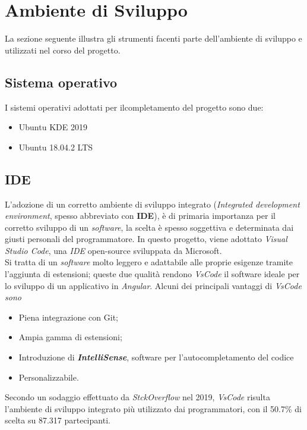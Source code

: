 \section{Ambiente di Sviluppo}
La sezione seguente illustra gli strumenti facenti parte dell'ambiente di sviluppo e utilizzati nel corso del progetto.

\subsection{Sistema operativo}
I sistemi operativi adottati per ilcompletamento del progetto sono due:
\begin{itemize}
	\item Ubuntu KDE 2019
	\item Ubuntu 18.04.2 LTS
\end{itemize}

\subsection{IDE}
L'adozione di un corretto ambiente di sviluppo integrato (\textit{Integrated development environment}, spesso abbreviato con \textbf{IDE}), è di primaria importanza per il corretto sviluppo di un \textit{software}, la scelta è spesso soggettiva e determinata dai giusti personali del programmatore.
In questo progetto, viene adottato \textit{Visual Studio Code}, una \textit{IDE} \gls{open-source} sviluppata da Microsoft.\\
Si tratta di un \textit{software} molto leggero e adattabile alle proprie esigenze tramite l'aggiunta di estensioni; queste due qualità rendono \textit{VsCode} il software ideale per lo sviluppo di un applicativo in \textit{Angular}.
Alcuni dei principali vantaggi di \textit{VsCode sono}
\begin{itemize}
	\item Piena integrazione con \gls{Git};
	\item Ampia gamma di estensioni;
	\item Introduzione di \textbf{\textit{IntelliSense}}, software per l'autocompletamento del codice
	\item Personalizzabile.
\end{itemize}
Secondo un sodaggio effettuato da \textit{StckOverflow} nel 2019, \textit{VsCode} risulta l'ambiente di sviluppo integrato più utilizzato dai programmatori, con il 50.7\% di scelta su 87.317 partecipanti.


